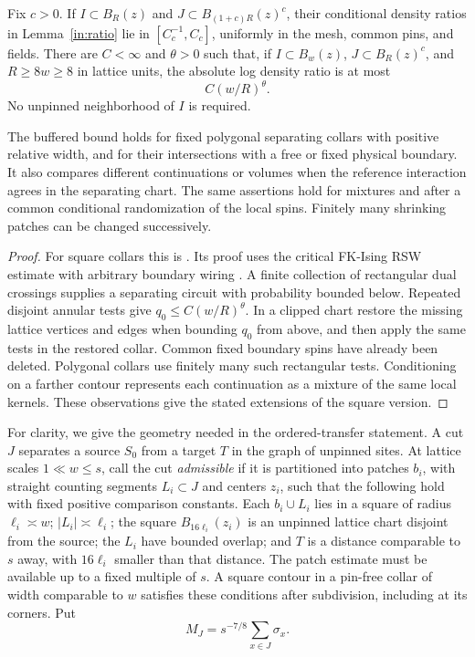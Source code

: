 \begin{corollary}\label{in:patch}
Fix $c>0$. If $I\subset B_R(z)$ and
$J\subset B_{(1+c)R}(z)^c$, their conditional density ratios in
Lemma~\ref{in:ratio} lie in $[C_c^{-1},C_c]$, uniformly in the mesh,
common pins, and fields. There are $C<\infty$ and $\theta>0$ such that,
if $I\subset B_w(z)$, $J\subset B_R(z)^c$, and $R\geq8w\geq8$ in
lattice units, the absolute log density ratio is at most
\begin{equation}\label{in:patch-bound}
 C(w/R)^\theta.
\end{equation}
No unpinned neighborhood of $I$ is required.

The buffered bound holds for fixed polygonal separating collars with
positive relative width, and for their intersections with a free or
fixed physical boundary. It also compares different continuations or
volumes when the reference interaction agrees in the separating
chart. The same assertions hold for mixtures and after a common
conditional randomization of the local spins. Finitely many shrinking
patches can be changed successively.
\end{corollary}

\begin{proof}
For square collars this is
\cite[Corollaries~2.5--2.6]{IsingToolkit}.
Its proof uses the critical FK-Ising RSW estimate with arbitrary
boundary wiring \cite{DHN2011}. A finite collection of rectangular
dual crossings supplies a separating circuit with probability bounded
below. Repeated disjoint annular tests give
$q_0\leq C(w/R)^\theta$. In a clipped chart restore the missing
lattice vertices and edges when bounding $q_0$ from above, and then
apply the same tests in the restored collar. Common fixed boundary
spins have already been deleted. Polygonal collars use finitely many
such rectangular tests. Conditioning on a farther contour represents
each continuation as a mixture of the same local kernels. These
observations give the stated extensions of the square version.
\end{proof}

For clarity, we give the geometry needed in the ordered-transfer
statement. A cut $J$ separates a source $S_0$ from a target $T$ in the
graph of unpinned sites. At lattice scales $1\ll w\leq s$, call the
cut \emph{admissible} if it is partitioned into patches $b_i$, with
straight counting segments $L_i\subset J$ and centers $z_i$, such that
the following hold with fixed positive comparison constants. Each
$b_i\cup L_i$ lies in a square of radius $\ell_i\asymp w$;
$|L_i|\asymp\ell_i$; the square $B_{16\ell_i}(z_i)$ is an unpinned
lattice chart disjoint from the source; the $L_i$ have bounded overlap;
and $T$ is a distance comparable to $s$ away, with
$16\ell_i$ smaller than that distance. The patch estimate must be
available up to a fixed multiple of $s$. A square contour in a
pin-free collar of width comparable to $w$ satisfies these conditions
after subdivision, including at its corners. Put
\[
 M_J=s^{-7/8}\sum_{x\in J}\sigma_x.
\]


